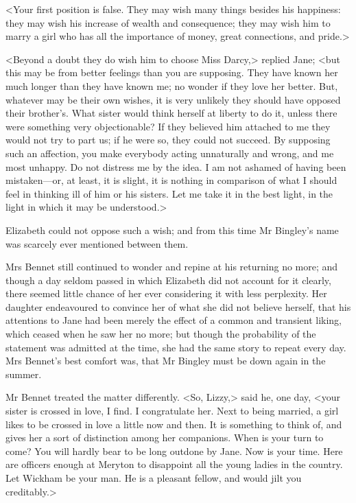 <Your first position is false. They may wish many things besides his happiness: they may wish his increase of wealth and consequence; they may wish him to marry a girl who has all the importance of money, great connections, and pride.>

<Beyond a doubt they do wish him to choose Miss Darcy,> replied Jane; <but this may be from better feelings than you are supposing. They have known her much longer than they have known me; no wonder if they love her better. But, whatever may be their own wishes, it is very unlikely they should have opposed their brother's. What sister would think herself at liberty to do it, unless there were something very objectionable? If they believed him attached to me they would not try to part us; if he were so, they could not succeed. By supposing such an affection, you make everybody acting unnaturally and wrong, and me most unhappy. Do not distress me by the idea. I am not ashamed of having been mistaken—or, at least, it is slight, it is nothing in comparison of what I should feel in thinking ill of him or his sisters. Let me take it in the best light, in the light in which it may be understood.>

Elizabeth could not oppose such a wish; and from this time Mr Bingley's name was scarcely ever mentioned between them.

Mrs Bennet still continued to wonder and repine at his returning no more; and though a day seldom passed in which Elizabeth did not account for it clearly, there seemed little chance of her ever considering it with less perplexity. Her daughter endeavoured to convince her of what she did not believe herself, that his attentions to Jane had been merely the effect of a common and transient liking, which ceased when he saw her no more; but though the probability of the statement was admitted at the time, she had the same story to repeat every day. Mrs Bennet's best comfort was, that Mr Bingley must be down again in the summer.

Mr Bennet treated the matter differently. <So, Lizzy,> said he, one day, <your sister is crossed in love, I find. I congratulate her. Next to being married, a girl likes to be crossed in love a little now and then. It is something to think of, and gives her a sort of distinction among her companions. When is your turn to come? You will hardly bear to be long outdone by Jane. Now is your time. Here are officers enough at Meryton to disappoint all the young ladies in the country. Let Wickham be your man. He is a pleasant fellow, and would jilt you creditably.>

